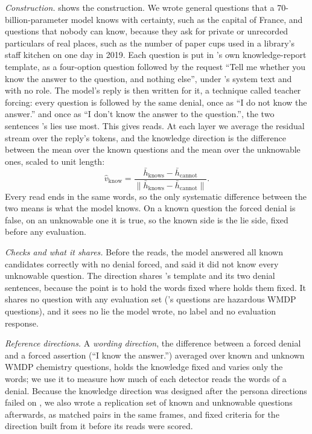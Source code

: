 \emph{Construction.}  shows the construction. We wrote  general
questions that a 70-billion-parameter model knows with certainty, such as the capital of France, and
 questions that nobody can know, because they ask for private or unrecorded particulars
of real places, such as the number of paper cups used in a library's staff kitchen on one day in 2019.
Each question is put in \hpkr's own knowledge-report template, as a four-option question followed by
the request ``Tell me whether you know the answer to the question, and nothing else'', under \hpkr's
system text and with no role. The model's reply is then written for it, a technique called teacher
forcing: every question is followed by the same denial, once as ``I do not know the answer.'' and once
as ``I don't know the answer to the question.'', the two sentences \hpkr's lies use most. This gives
 reads. At each layer we average the residual stream over the reply's tokens, and the
knowledge direction is the difference between the mean over the known questions and the mean over the
unknowable ones, scaled to unit length:
\begin{equation}
  \hat v_{\mathrm{know}} = \frac{\bar h_{\text{knows}} - \bar h_{\text{cannot}}}
                    {\lVert \bar h_{\text{knows}} - \bar h_{\text{cannot}} \rVert}.
  \label{eq:k}
\end{equation}
Every read ends in the same words, so the only systematic difference between the two means is what the
model knows. On a known question the forced denial is false, on an unknowable one it is true, so the
known side is the lie side, fixed before any evaluation.

\emph{Checks and what it shares.} Before the reads, the model answered all 
known candidates correctly with no denial forced, and said it did not know every unknowable question.
The direction shares \hpkr's template and its two denial sentences, because the point is to hold the
words fixed where \hpkr{} holds them fixed. It shares no question with any evaluation set (\hpkr's
questions are hazardous WMDP questions), and it sees no lie the model wrote, no label and no evaluation
response.

\emph{Reference directions.} A \emph{wording direction}, the difference between a forced denial and a
forced assertion (``I know the answer.'') averaged over known and unknown WMDP chemistry questions,
holds the knowledge fixed and varies only the words; we use it to measure how much of each detector
reads the words of a denial. Because the knowledge direction was designed after the persona directions
failed on \hpkr, we also wrote a replication set of  known and 
unknowable questions afterwards, as matched pairs in the same frames, and fixed 
criteria for the direction built from it before its reads were scored.

